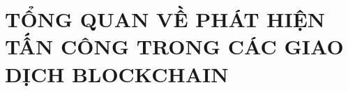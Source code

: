 \clearpage
{}

\setcounter{chapter}{0}
\chapter[{TỔNG QUAN VỀ PHÁT HIỆN TẤN CÔNG TRONG CÁC GIAO DỊCH BLOCKCHAIN}]{TỔNG QUAN VỀ PHÁT HIỆN TẤN CÔNG TRONG CÁC GIAO DỊCH BLOCKCHAIN}
\label{sec:back}

~\cite{Yang2021}